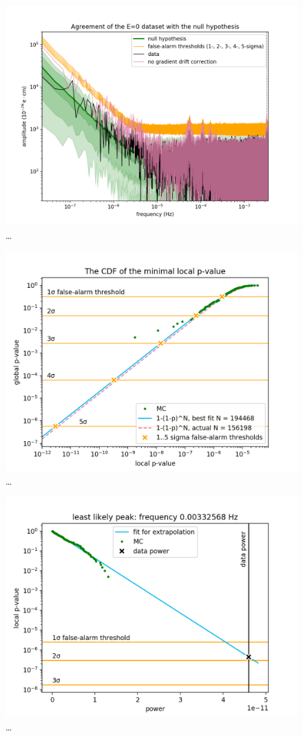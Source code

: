 \begin{figure}
  \centering
  \includegraphics[width=\linewidth]{gfx/axions/E0_detection_and_no_GDC.png}
  \caption{\ldots}
  \label{fig:E0_detection_and_no_GDC}
\end{figure}
\begin{figure}
  \centering
  \includegraphics[width=\linewidth]{gfx/axions/E0_look-elsewhere.png}
  \caption{\ldots}
  \label{fig:E0_look-elsewhere}
\end{figure}
\begin{figure}
  \centering
  \includegraphics[width=\linewidth]{gfx/axions/E0_best_signal_candidate.png}
  \caption{\ldots}
  \label{fig:E0_best_signal_candidate}
\end{figure}

